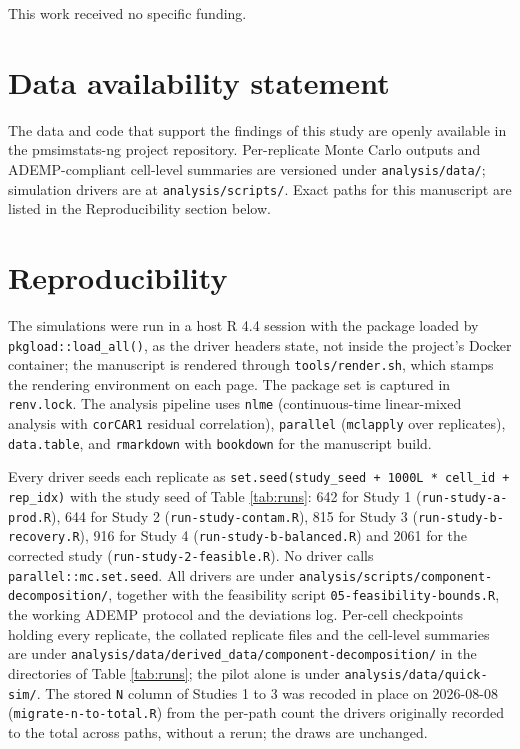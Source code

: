 \documentclass[
  11pt,
]{article}
\begin{document}
This work received no specific funding.

\section{Data availability statement}\label{data-availability-statement}

The data and code that support the findings of this study are
openly available in the pmsimstats-ng project repository.
Per-replicate Monte Carlo outputs and ADEMP-compliant cell-level
summaries are versioned under \texttt{analysis/data/};
simulation drivers are at \texttt{analysis/scripts/}. Exact
paths for this manuscript are listed in the Reproducibility
section below.

\section{Reproducibility}\label{reproducibility}

The simulations were run in a host R 4.4 session with the package loaded
by \texttt{pkgload::load\_all()}, as the driver headers state, not inside
the project's Docker container; the manuscript is rendered through
\texttt{tools/render.sh}, which stamps the rendering environment on each
page. The package set is captured in \texttt{renv.lock}. The analysis
pipeline uses \texttt{nlme} (continuous-time linear-mixed analysis with
\texttt{corCAR1} residual correlation), \texttt{parallel} (\texttt{mclapply}
over replicates), \texttt{data.table}, and \texttt{rmarkdown} with
\texttt{bookdown} for the manuscript build.

Every driver seeds each replicate as \texttt{set.seed(study\_seed +
1000L * cell\_id + rep\_idx)} with the study seed of Table \ref{tab:runs}:
642 for Study 1 (\texttt{run-study-a-prod.R}), 644 for Study 2
(\texttt{run-study-contam.R}), 815 for Study 3
(\texttt{run-study-b-recovery.R}), 916 for Study 4
(\texttt{run-study-b-balanced.R}) and 2061 for the corrected study
(\texttt{run-study-2-feasible.R}). No driver calls
\texttt{parallel::mc.set.seed}. All drivers are under
\texttt{analysis/scripts/component-decomposition/}, together with the
feasibility script \texttt{05-feasibility-bounds.R}, the working ADEMP
protocol and the deviations log. Per-cell checkpoints holding every
replicate, the collated replicate files and the cell-level summaries are
under \texttt{analysis/data/derived\_data/component-decomposition/} in
the directories of Table \ref{tab:runs}; the pilot alone is under
\texttt{analysis/data/quick-sim/}. The stored \texttt{N} column of
Studies 1 to 3 was recoded in place on 2026-08-08
(\texttt{migrate-n-to-total.R}) from the per-path count the drivers
originally recorded to the total across paths, without a rerun; the
draws are unchanged.
\end{document}
